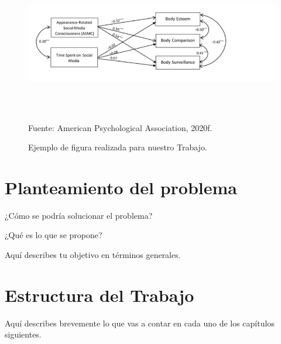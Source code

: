 \begin{figure}[ht]
	\begin{center}
		\caption{Ejemplo de figura realizada para nuestro Trabajo.}
		\label{fig:fig-1}
		\includegraphics[width=4.90737in,height=2.42708in]{figura}

		\small Fuente: American Psychological Association, 2020f.
	\end{center}
\end{figure}

\section{Planteamiento del problema}

¿Cómo se podría solucionar el problema?

¿Qué es lo que se propone?

Aquí describes tu objetivo en términos generales.

\section{Estructura del Trabajo}

Aquí describes brevemente lo que vas a contar en cada uno de los capítulos siguientes.